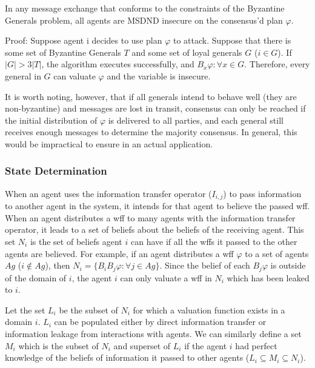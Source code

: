 \begin{thm}
In any message exchange that conforms to the constraints of the Byzantine Generals problem, all agents are MSDND insecure on the consensus'd plan $\varphi$.
\end{thm}

Proof: Suppose agent i decides to use plan $\varphi$ to attack. Suppose that there is some set of Byzantine Generals $T$ and some set of loyal generals $G$ ($i \in G$). If $|G| > 3|T|$, the algorithm executes successfully, and $B_x \varphi : \forall x \in G $. Therefore, every general in $G$ can valuate $\varphi$ and the variable is insecure.

It is worth noting, however, that if all generals intend to behave well (they are non-byzantine) and messages are lost in transit, consensus can only be reached if the initial distribution of $\varphi$ is delivered to all parties, and each general still receives enough messages to determine the majority consensus. In general, this would be impractical to ensure in an actual application.

\subsubsection{State Determination}

When an agent uses the information transfer operator ($I_{i,j}$) to pass information to another agent in the system, it intends for that agent to believe the passed wff. When an agent distributes a wff to many agents with the information transfer operator, it leads to a set of beliefs about the beliefs of the receiving agent. This set $N_i$ is the set of beliefs agent $i$ can have if all the wffs it passed to the other agents are believed. For example, if an agent distributes a wff $\varphi$ to a set of agents $Ag$ ($i \not \in Ag$), then $N_i = \{ B_i B_j \varphi : \forall j \in Ag \}$. Since the belief of each $B_j \varphi$ is outside of the domain of $i$, the agent $i$ can only valuate a wff in $N_i$ which has been leaked to $i$.

Let the set $L_i$ be the subset of $N_i$ for which a valuation function exists in a domain $i$. $L_i$ can be populated either by direct information transfer or information leakage from interactions with agents. We can similarly define a set $M_i$ which is the subset of $N_i$ and superset of $L_i$ if the agent $i$ had perfect knowledge of the beliefs of information it passed to other agents ($L_i \subseteq M_i \subseteq N_i$). 

